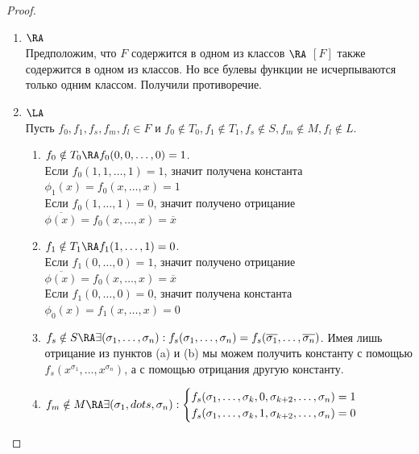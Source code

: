 \documentclass[a4paper, 14pt]{article}
\begin{document}
    \begin{proof}
        \begin{enumerate}
            \item $\RA$ \\
            Предположим, что $F$ содержится в одном из классов $\RA$ $[F]$
            также содержится в одном из классов. Но все булевы функции не 
            исчерпываются только одним классом. Получили противоречие.
            \item $\LA$ \\
            Пусть $f_0, f_1, f_s, f_m, f_l \in F$ и $f_0 \notin T_0, 
            f_1 \notin T_1, f_s \notin S, f_m \notin M, f_l \notin L$.

            \begin{enumerate}
                \item $f_0 \notin T_0 \RA f_0(0,0,\dots, 0) = 1$. \\
                Если $f_0(1, 1, \dots, 1) = 1$, значит получена константа
                $\phi_1(x) = f_0(x, \dots, x) = 1$ \\
                Если $f_0(1, \dots, 1) = 0$, значит получено отрицание
                $\overline{\phi(x)} = f_0(x, \dots, x) = \overline{x}$

                \item $f_1 \notin T_1 \RA f_1(1, \dots, 1) = 0$. \\
                Если $f_1(0, \dots, 0) = 1$, значит получено отрицание
                $\overline{\phi(x)} = f_0(x, \dots, x) = \overline{x}$ \\
                Если $f_1(0, \dots, 0) = 0$, значит получена константа
                $\phi_0(x) = f_1(x, \dots, x) = 0$

                \item $f_s \notin S \RA \exists (\sigma_1, \dots, \sigma_n) : f_s(\sigma_1, \dots, \sigma_n) = f_s(\overline{\sigma_1}, \dots, \overline{\sigma_n})$.  
                Имея лишь отрицание из пунктов (a) и (b) мы можем получить константу с помощью
                $f_s(x^{\sigma_1}, \dots, x^{\sigma_n})$, а с помощью отрицания другую константу.

                \item $f_m \notin M \RA \exists (\sigma_1, dots, \sigma_n) : 
                \begin{cases}
                    f_s(\sigma_1, \dots, \sigma_k, 0, \sigma_{k+2}, \dots, \sigma_n) = 1 \\
                    f_s(\sigma_1, \dots, \sigma_k, 1, \sigma_{k+2}, \dots, \sigma_n) = 0
                \end{cases}$


\end{enumerate}
\end{enumerate}
\end{proof}
\end{document}

